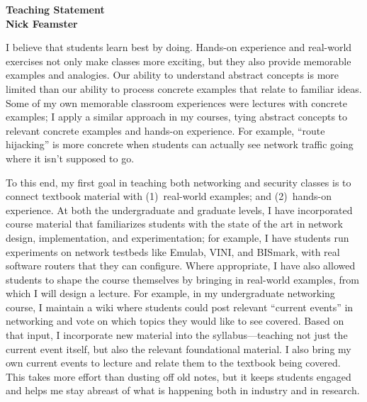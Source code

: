 \newpage \setcounter{page}{1}

\vspace*{-0.5in}
\begin{center}
{\Large\textbf{Teaching Statement}}\\[0.1in] {\large\textbf{Nick
Feamster}}\\
\end{center}
I believe that students learn best by doing.  Hands-on experience and
real-world exercises not only make classes more exciting, but they
also provide memorable examples and analogies.  Our ability to
understand abstract concepts is more limited than our ability to process
concrete examples that relate to familiar ideas.  Some of
my own memorable classroom experiences were lectures with concrete
examples; I apply a similar approach in my courses, tying abstract
concepts to relevant concrete examples and hands-on experience.  For
example, ``route hijacking'' is more concrete when students can
actually see network traffic going where it isn't supposed to go.

To this end, my first goal in teaching both networking and security
classes is to connect textbook material with (1)~real-world examples;
and (2)~hands-on experience.  At both the undergraduate and graduate
levels, I have incorporated course material that familiarizes students
with the state of the art in network design, implementation, and
experimentation; for example, I have students run experiments on network
testbeds like Emulab, VINI, and BISmark, with real software routers that
they can configure.  Where appropriate, I have also allowed students to
shape the course themselves by bringing in real-world examples, from
which I will design a lecture.  For example, in my undergraduate
networking course, I maintain a wiki where students could post relevant
``current events'' in networking and vote on which topics they would
like to see covered.  Based on that input, I incorporate new material
into the syllabus---teaching not just the current event itself, but also
the relevant foundational material.  I also bring my own current events
to lecture and relate them to the textbook being covered.  This takes
more effort than dusting off old notes, but it keeps students engaged
and helps me stay abreast of what is happening both in industry and in
research.


